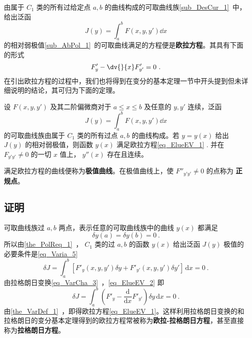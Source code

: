 
由属于 $C_1$ 类的所有过给定点 $a,b$ 的曲线构成的可取曲线族\autoref{sub_DesCur_1}~中，给出泛函 
\begin{equation}
J(y)=\int_a^bF(x,y,y')\dd x
\end{equation}
的相对弱极值\autoref{sub_AbPol_1}~的可取曲线满足的方程便是\textbf{欧拉方程}。其具有下面的形式
\begin{equation}\label{eq_ElueEV_1}
F'_y-\dv{}{x}F'_{y'}=0~.
\end{equation}
在引出欧拉方程的过程中，我们也将得到在变分的基本定理一节中开头提到但未详细说明的结论，其可归为下面的定理。
\begin{theorem}{}
设 $F(x,y,y')$ 及其二阶偏微商对于 $a\leq x\leq b$ 及任意的 $y,y'$ 连续，泛函
\begin{equation}
J(y)=\int_a^b F(x,y,y')\dd x
\end{equation}
的可取曲线族由属于 $C_1$ 类的所有过点 $a,b$ 的曲线构成。若 $y=y(x)$ 给出 $J(y)$ 的相对弱极值，则函数 $y(x)$ 满足欧拉方程\autoref{eq_ElueEV_1} .
并在 $F_{y'y'}\neq0$ 的一切 $x$ 值上， $y''(x)$ 存在且连续。

\end{theorem}
满足欧拉方程的曲线便称为\textbf{极值曲线}。在极值曲线上，使 $F''_{y'y'}\neq0$ 的点称为 \textbf{正规点}。
\subsection{证明}
可取曲线族过 $a,b$ 两点，表示任意的可取曲线族中的曲线 $y(x)$ 都满足 
\begin{equation}
\delta y(a)=\delta y(b)=0~.
\end{equation}
所以由\autoref{the_PolReq_1}~， $C_1$ 类的过 $a,b$ 的函数 $y(x)$ 给出泛函 $J(y)$ 极值的必要条件是\autoref{eq_Varia_5}~
\begin{equation}\label{eq_ElueEV_2}
\delta J=\int_a^b \left[F'_y(x,y,y')\delta y+F'_{y'}(x,y,y')\delta y' \right]  \,\mathrm{d}{x} =0~.
\end{equation}
由拉格朗日变换\autoref{eq_VarCha_3}~，\autoref{eq_ElueEV_2} 即
\begin{equation}
\delta J=\int_a^b \left(F'_y- \frac{\mathrm{d}{}}{\mathrm{d}{x}} F'_{y'} \right) \delta y \,\mathrm{d}{x} =0~.
\end{equation}
由\autoref{the_VarDef_1}~，即得欧拉方程\autoref{eq_ElueEV_1}。这样利用拉格朗日变换的和拉格朗日的变分基本定理得到的欧拉方程常被称为\textbf{欧拉-拉格朗日方程}，甚至直接称为\textbf{拉格朗日方程}。

